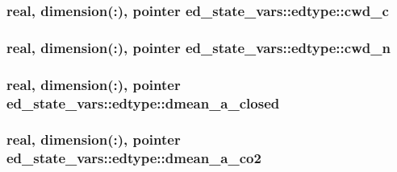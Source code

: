 \subsubsection[{\texorpdfstring{cwd\+\_\+c}{cwd_c}}]{\setlength{\rightskip}{0pt plus 5cm}real, dimension(\+:), pointer ed\+\_\+state\+\_\+vars\+::edtype\+::cwd\+\_\+c}\hypertarget{structed__state__vars_1_1edtype_ad8323a46f76373e8fec13f376b6643e9}{}\label{structed__state__vars_1_1edtype_ad8323a46f76373e8fec13f376b6643e9}
\subsubsection[{\texorpdfstring{cwd\+\_\+n}{cwd_n}}]{\setlength{\rightskip}{0pt plus 5cm}real, dimension(\+:), pointer ed\+\_\+state\+\_\+vars\+::edtype\+::cwd\+\_\+n}\hypertarget{structed__state__vars_1_1edtype_acb3b592b6f9c5b115802cc8a04b19a40}{}\label{structed__state__vars_1_1edtype_acb3b592b6f9c5b115802cc8a04b19a40}
\subsubsection[{\texorpdfstring{dmean\+\_\+a\+\_\+closed}{dmean_a_closed}}]{\setlength{\rightskip}{0pt plus 5cm}real, dimension(\+:), pointer ed\+\_\+state\+\_\+vars\+::edtype\+::dmean\+\_\+a\+\_\+closed}\hypertarget{structed__state__vars_1_1edtype_a1fa3c391f21f55711c2262336ec0788b}{}\label{structed__state__vars_1_1edtype_a1fa3c391f21f55711c2262336ec0788b}
\subsubsection[{\texorpdfstring{dmean\+\_\+a\+\_\+co2}{dmean_a_co2}}]{\setlength{\rightskip}{0pt plus 5cm}real, dimension(\+:), pointer ed\+\_\+state\+\_\+vars\+::edtype\+::dmean\+\_\+a\+\_\+co2}\hypertarget{structed__state__vars_1_1edtype_ab926319a26f6cea31761b724b05ad965}{}\label{structed__state__vars_1_1edtype_ab926319a26f6cea31761b724b05ad965}
